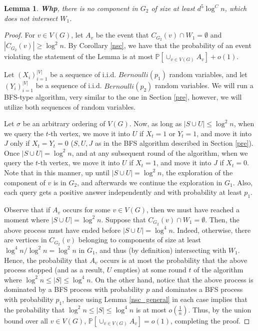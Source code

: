 \documentclass[notitlepage]{scrartcl}
\newtheorem{lemma}[thm]{Lemma}
\begin{document}
\begin{lemma} \label{big_intersect_W}
    \textbf{Whp}, there is no component in $G_2$ of size at least $d^5\log^C n$, which does not intersect $W_1$.
\end{lemma}

\begin{proof}
    For $v\in V(G)$, let $A_v$ be the event that $C_{G_2}(v)\cap W_1=\emptyset$ and $|C_{G_2}(v)|\geq \log^2 n$. By Corollary \ref{nsc}, we have that the probability of an event violating the statement of the Lemma is at most $\mathbb{P}\left[\cup_{v\in V(G)} A_v\right]+o(1)$.
    
    Let $(X_i)_{i=1}^{|V|}$ be a sequence of i.i.d. $Bernoulli(p_1)$ random variables, and let $(Y_i)_{i=1}^{|V|}$ be a sequence of i.i.d. $Bernoulli(p_2)$ random variables. We will run a BFS-type algorithm, very similar to the one in Section \ref{pre}, however, we will utilize both sequences of random variables.
    
    Let $\sigma$ be an arbitrary ordering of $V(G)$. Now, as long as $|S\cup U|\leq \log^2 n$, when we query the $t$-th vertex, we move it into $U$ if $X_t = 1$ or $Y_t = 1$, and move it into $J$ only if $X_t = Y_t = 0$ ($S,U,J$ as in the BFS algorithm described in Section \ref{pre}). Once $|S \cup U| = \log^2 n$, and at any subsequent round of the algorithm, when we query the $t$-th vertex, we move it into $U$ if $X_t = 1$, and move it into $J$ if $X_t = 0$. Note that in this manner, up until $|S \cup U| = \log^2 n$, the exploration of the component of $v$ is in $G_2$, and afterwards we continue the exploration in $G_1$. Also, each query gets a positive answer independently and with probability at least $p_1$.

    Observe that if $A_v$ occurs for some $v\in V(G)$, then we must have reached a moment where $|S \cup U| = \log^2 n$. Suppose that $C_{G_2}(v) \cap W_1 = \emptyset$. Then, the above process must have ended before $|S \cup U| = \log^4 n$. Indeed, otherwise, there are vertices in $C_{G_2}(v)$ belonging to components of size at least $\log^4 n/ \log^2 n = \log^2 n$ in $G_1$, and thus (by definition) intersecting with $W_1$. Hence, the probability that $A_v$ occurs is at most the probability that the above process stopped (and as a result, $U$ empties) at some round $t$ of the algorithm where $\log^2 n \leq |S| \leq \log^4 n$. On the other hand, notice that the above process is dominated by a BFS process with probability $p$ and dominates a BFS process with probability $p_1$, hence using Lemma \ref{nsc_general} in each case implies that the probability that $\log^2 n \leq |S| \leq \log^4 n$ is at most $o\left(\frac{1}{n}\right)$. Thus, by the union bound over all $v\in V(G)$, $\mathbb{P}\left[\cup_{v\in V(G)} A_v\right]=o(1)$, completing the  proof.
\end{proof}
\end{document}

